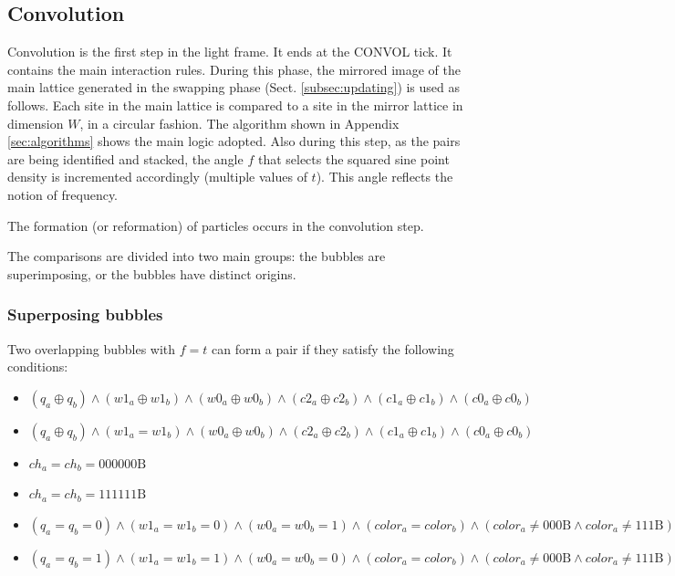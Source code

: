 \documentclass[12pt]{article}
\begin{document}
\subsection{Convolution} \label{subsec:convolution}
Convolution is the first step in the light frame. It ends at the CONVOL tick. It contains the main interaction rules. During this phase, the mirrored image of the main lattice generated in the swapping phase (Sect. \ref{subsec:updating}) is used as follows. Each site in the main lattice is compared to a site in the mirror lattice in dimension $W  $, in a circular fashion. The algorithm shown in Appendix \ref{sec:algorithms} shows the main logic adopted. Also during this step, as the pairs are being identified and stacked, the angle $f$ that selects the squared sine point density is incremented accordingly (multiple values of $t$). This angle reflects the notion of frequency.

The formation (or reformation) of particles occurs in the convolution step.

The comparisons are divided into two main groups: the bubbles are superimposing, or the bubbles have distinct origins.

\subsubsection{Superposing bubbles}
Two overlapping bubbles with $f=t$ can form a pair if they satisfy the following conditions:
\begin{itemize}
\item
$ (q_a \oplus q_b) \land (w1_a \oplus w1_b) \land (w0_a \oplus w0_b) \land (c2_a \oplus c2_b) \land (c1_a \oplus c1_b) \land (c0_a \oplus c0_b) $
\item

$ (q_a \oplus q_b) \land (w1_a = w1_b) \land (w0_a \oplus w0_b) \land (c2_a \oplus c2_b) \land (c1_a \oplus c1_b) \land (c0_a \oplus c0_b) $
\item

$ ch_a = ch_b = 000000\mathrm{B} $
\item

$ ch_a = ch_b = 111111\mathrm{B} $
\item

$ (q_a = q_b = 0) \land (w1_a = w1_b = 0) \land (w0_a = w0_b = 1) \land (color_a = color_b) \land (color_a \neq 000\mathrm{B} \land color_a \neq 111\mathrm{B}) $
\item

$ (q_a = q_b = 1) \land (w1_a = w1_b = 1) \land (w0_a = w0_b = 0) \land (color_a = color_b) \land (color_a \neq 000\mathrm{B} \land color_a \neq 111\mathrm{B}) $

\end{itemize}
\end{document}
